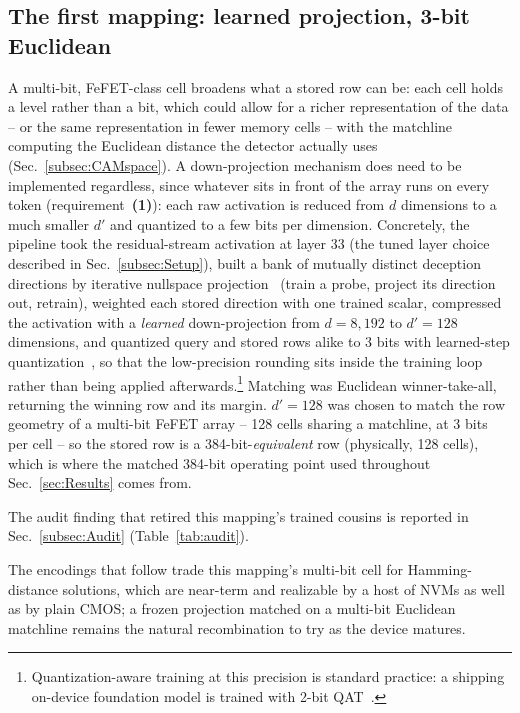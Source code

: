 \documentclass[conference]{IEEEtran}
\newcommand{\fefet}{{FeFET}\xspace}
\begin{document}
\subsection{The first mapping: learned projection, 3-bit Euclidean}
\label{subsec:FirstPipeline}
A multi-bit, \fefet-class cell broadens what a stored row can be:
each cell holds a level rather than a bit, which could allow for a
richer representation of the data -- or the same representation in
fewer memory cells -- with the matchline computing the Euclidean
distance the detector actually uses (Sec.~\ref{subsec:CAMspace}). A
down-projection mechanism does need to be implemented regardless,
since whatever sits in front of the array runs on every token
(requirement~{\bf (1)}): each raw activation is reduced from $d$
dimensions to a much smaller $d'$ and quantized to a few bits per
dimension.
Concretely, the pipeline took the residual-stream
activation at layer 33 (the tuned layer choice described in
Sec.~\ref{subsec:Setup}), built a bank of mutually distinct deception
directions by iterative nullspace
projection~\cite{ravfogel2020inlp} (train a probe, project its direction
out, retrain), weighted each stored direction with one trained scalar,
compressed the activation with a \emph{learned} down-projection from
$d=8{,}192$ to $d'=128$ dimensions, and quantized query and stored rows
alike to 3 bits with learned-step quantization~\cite{esser2020lsq}, so
that the low-precision rounding sits inside the training loop rather
than being applied afterwards.\footnote{Quantization-aware training at
this precision is standard practice: a shipping on-device foundation
model is trained with 2-bit QAT~\cite{apple2025foundation}.} Matching
was Euclidean winner-take-all, returning the winning row and its
margin. $d'=128$ was chosen to match the row geometry of a multi-bit
\fefet array -- 128 cells sharing a matchline, at 3 bits per cell --
so the stored row is a 384-bit-\emph{equivalent} row (physically, 128
cells), which is where the matched 384-bit operating point used
throughout Sec.~\ref{sec:Results} comes
from.

The audit finding that retired this mapping's trained cousins is
reported in Sec.~\ref{subsec:Audit} (Table~\ref{tab:audit}).

\label{subsec:PathBack}%
The encodings that follow trade this mapping's multi-bit cell for
Hamming-distance solutions, which are near-term and realizable by a
host of NVMs as well as by plain CMOS; a frozen projection matched on
a multi-bit Euclidean matchline remains the natural recombination to
try as the device matures.
\end{document}
